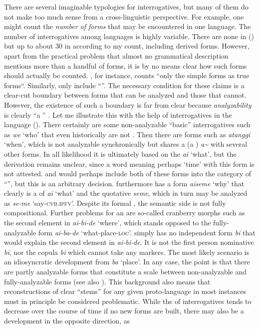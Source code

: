 There are several imaginable typologies for interrogatives, but many of them do not make too much sense from a cross-linguistic perspective. For example, one might count the \textit{number of forms} that may be encountered in one language. The number of interrogatives among languages is highly variable. There are none in  (\citealt{EverettKern1997}) but up to about 30 in  according to my count, including derived forms. However, apart from the practical problem that almost no grammatical description mentions more than a handful of forms, it is by no means clear how such forms should actually be counted. \citet[1133]{Mackenzie2009}, for instance, counts “only the simple forms as true  forms“. Similarly, \citet[46]{Hengeveld2012} only include “”. The necessary condition for these claims is a clear-cut boundary between forms that can be analyzed and those that cannot. However, the existence of such a boundary is far from clear because \textit{analyzability} is clearly “a ” \citep[352]{Langacker2008}. Let me illustrate this with the help of interrogatives in the  language  (). There certainly are some non-analyzable “basic” interrogatives such as \textit{we} ‘who’ that even historically are not . Then there are forms such as \textit{atanggi} ‘when’, which is not analyzable synchronically but shares a  (a ) \textit{a{\textasciitilde}} with several other forms. In all likelihood it is ultimately based on the  \textit{ai} ‘what’, but the derivation remains unclear, since a word meaning perhaps ‘time’ with this form is not attested. \citet{Mackenzie2009} and \citet{Hengeveld2012} would perhaps include both of these forms into the category of “”, but this is an arbitrary decision.  furthermore has a form \textit{aiseme} ‘why’ that clearly is a  of \textit{ai} ‘what’ and the quotative \textit{seme}, which in turn may be analyzed as \textit{se-me} ‘say-\textsc{cvb.ipfv}’. Despite its formal , the semantic side is not fully compositional. Further problems for an  are so-called cranberry morphs such as the second element in  \textit{ai-bi-de} ‘where’, which stands opposed to the fully-analyzable form \textit{ai-ba-de} ‘what-place-\textsc{loc}’.  simply has no independent form \textit{bi} that would explain the second element in \textit{ai-bi-de}. It is not the first person  nominative \textit{bi}, nor the copula \textit{bi} which cannot take any  markers. The most likely scenario is an idiosyncratic development from \textit{ba} ‘place’. In any case, the point is that there are partly analyzable forms that constitute a scale between non-analyzable and fully-analyzable forms (see also \citealt{Cysouw2005}). This background also means that reconstructions of clear  “stems” for any given proto-language in most instances must in principle be considered problematic. While the  of interrogatives tends to decrease over the course of time if no new forms are built, there may also be a development in the opposite direction, as 